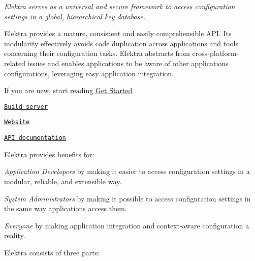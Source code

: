 \href{https://github.com/ElektraInitiative/libelektra/releases/latest}{\tt } \href{https://build.libelektra.org/job/libelektra/job/master/lastBuild}{\tt } \href{https://travis-ci.org/ElektraInitiative/libelektra}{\tt } \href{https://cirrus-ci.com/github/ElektraInitiative/libelektra}{\tt } \href{https://coveralls.io/github/ElektraInitiative/libelektra}{\tt } \href{https://lgtm.com/projects/g/ElektraInitiative/libelektra/alerts}{\tt }

{\itshape Elektra serves as a universal and secure framework to access configuration settings in a global, hierarchical key database.}



Elektra provides a mature, consistent and easily comprehensible A\+PI. Its modularity effectively avoids code duplication across applications and tools concerning their configuration tasks. Elektra abstracts from cross-\/platform-\/related issues and enables applications to be aware of other applications\textquotesingle{} configurations, leveraging easy application integration.


\begin{DoxyItemize}
\item If you are new, start reading \hyperlink{doc_GETSTARTED_md}{Get Started}
\item \href{https://build.libelektra.org/}{\tt Build server}
\item \href{https://www.libelektra.org}{\tt Website}
\item \href{https://doc.libelektra.org/api/master/html/}{\tt A\+PI documentation}
\end{DoxyItemize}

Elektra provides benefits for\+:


\begin{DoxyEnumerate}
\item {\itshape Application Developers} by making it easier to access configuration settings in a modular, reliable, and extensible way.
\item {\itshape System Administrators} by making it possible to access configuration settings in the same way applications access them.
\item {\itshape Everyone} by making application integration and context-\/aware configuration a reality.
\end{DoxyEnumerate}

Elektra consists of three parts\+:


